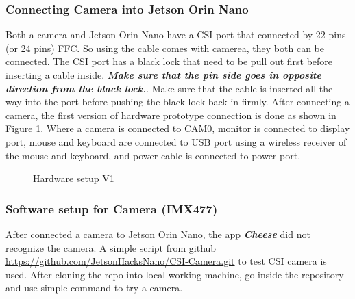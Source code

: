 \documentclass[12pt,hidelinks]{article}
\begin{document}
        \subsubsection{Connecting Camera into Jetson Orin Nano}
        \label{subsubsec:connect_camera}

        Both a camera and Jetson Orin Nano have a CSI port that connected by 22 pins (or 24 pins) FFC. So using the cable comes with camerea, they both can be connected. The CSI port has a black lock that need to be pull out first before inserting a cable inside. \textbf{\emph{Make sure that the pin side goes in opposite direction from the black lock.}}. Make sure that the cable is inserted all the way into the port before pushing the black lock back in firmly. After connecting a camera, the first version of hardware prototype connection is done as shown in Figure \ref{fig:hardware_setup_v1}. Where a camera is connected to CAM0, monitor is connected to display port, mouse and keyboard are connected to USB port using a wireless receiver of the mouse and keyboard, and power cable is connected to power port.

        \begin{figure}[ht] %
            \centering
            \setlength{\fboxsep}{0pt}
            \setlength{\fboxrule}{1pt}
            \caption{Hardware setup V1}
            \label{fig:hardware_setup_v1}
        \end{figure}

        \subsubsection{Software setup for Camera (IMX477)}
        \label{subsubsec:software_setup_imx477}


        After connected a camera to Jetson Orin Nano, the app \textbf{\emph{Cheese}} did not recognize the camera. A simple script from github {\footnotesize \url{https://github.com/JetsonHacksNano/CSI-Camera.git}} to test CSI camera is used. After cloning the repo into local working machine, go inside the repository and use simple command to try a camera.
\end{document}
